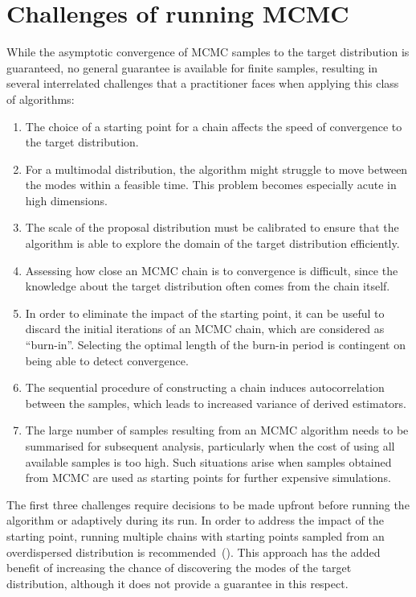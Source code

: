 \documentclass[11pt,a4paper]{report}
\begin{document}
\section{Challenges of running MCMC}

While the asymptotic convergence of MCMC samples to the target distribution is guaranteed, no general guarantee is available for finite samples, resulting in several interrelated challenges that a practitioner faces when applying this class of algorithms:
\begin{enumerate}
\item The choice of a starting point for a chain affects the speed of convergence to the target distribution.
\item For a multimodal distribution, the algorithm might struggle to move between the modes within a feasible time. This problem becomes especially acute in high dimensions.
\item The scale of the proposal distribution must be calibrated to ensure that the algorithm is able to explore the domain of the target distribution efficiently.
\item Assessing how close an MCMC chain is to convergence is difficult, since the knowledge about the target distribution often comes from the chain itself.
\item In order to eliminate the impact of the starting point, it can be useful to discard the initial iterations of an MCMC chain, which are considered as ``burn-in''. Selecting the optimal length of the burn-in period is contingent on being able to detect convergence.
\item The sequential procedure of constructing a chain induces autocorrelation between the samples, which leads to increased variance of derived estimators.
\item The large number of samples resulting from an MCMC algorithm needs to be summarised for subsequent analysis, particularly when the cost of using all available samples is too high. Such situations arise when samples obtained from MCMC are used as starting points for further expensive simulations.
\end{enumerate}

The first three challenges require decisions to be made upfront before running the algorithm or adaptively during its run. In order to address the impact of the starting point, running multiple chains with starting points sampled from an overdispersed distribution is recommended~(\cite{gelmanInferenceIterativeSimulation1992}). This approach has the added benefit of increasing the chance of discovering the modes of the target distribution, although it does not provide a guarantee in this respect. 
\end{document}
